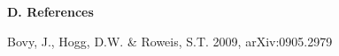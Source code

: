 




\pagestyle{empty} 
\def\bpar{\hangindent 2pc \hangafter 1}

\vskip -0.7in

{\large {\bf D. References}}

\vskip 0.1in
\bpar	
Bovy, J., Hogg, D.W. \& Roweis, S.T. 2009, arXiv:0905.2979 \\

